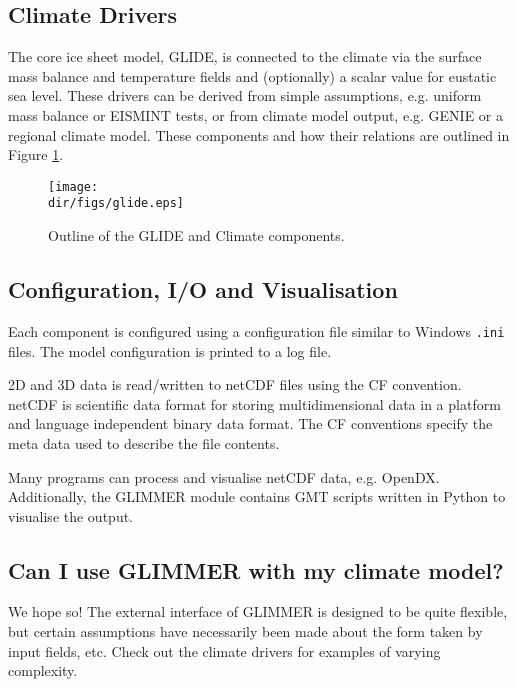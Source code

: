 \subsection{Climate Drivers}
The core ice sheet model, GLIDE, is connected to the climate via the surface mass balance and temperature fields and (optionally) a scalar value for eustatic sea level. These drivers can be derived from simple assumptions, e.g. uniform mass balance or EISMINT tests, or from climate model output, e.g. GENIE or a regional climate model. These components and how their relations are outlined in Figure \ref{ug.glide}.

\begin{figure}[htbp]
 \begin{center}
   \texttt{[image: \\dir/figs/glide.eps]}
 \end{center}
 \caption{Outline of the GLIDE and Climate components.}
\label{ug.glide}
\end{figure}

\subsection{Configuration, I/O and Visualisation}
Each component is configured using a configuration file similar to Windows \texttt{.ini} files. The model configuration is printed to a log file. 

2D and 3D data is read/written to netCDF files using the CF convention. netCDF is scientific data format for storing multidimensional data in a platform and language independent binary data format. The CF conventions specify the meta data used to describe the file contents.

Many programs can process and visualise netCDF data, e.g. OpenDX. Additionally, the GLIMMER module contains GMT scripts written in Python to visualise the output.

\subsection{Can I use GLIMMER with my climate model?}
We hope so! The external interface of GLIMMER is designed to be quite
flexible, but certain assumptions have necessarily been made about the form
taken by input fields, etc. Check out the climate drivers for examples of varying complexity.
